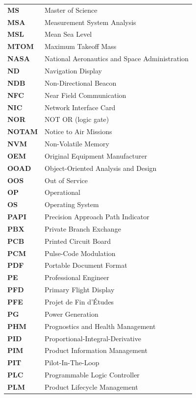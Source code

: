 \begin{longtable}{p{3cm}p{11cm}}
\textbf{MS} & Master of Science \\
\textbf{MSA} & Measurement System Analysis \\
\textbf{MSL} & Mean Sea Level \\
\textbf{MTOM} & Maximum Takeoff Mass \\
\textbf{NASA} & National Aeronautics and Space Administration \\
\textbf{ND} & Navigation Display \\
\textbf{NDB} & Non-Directional Beacon \\
\textbf{NFC} & Near Field Communication \\
\textbf{NIC} & Network Interface Card \\
\textbf{NOR} & NOT OR (logic gate) \\
\textbf{NOTAM} & Notice to Air Missions \\
\textbf{NVM} & Non-Volatile Memory \\
\textbf{OEM} & Original Equipment Manufacturer \\
\textbf{OOAD} & Object-Oriented Analysis and Design \\
\textbf{OOS} & Out of Service \\
\textbf{OP} & Operational \\
\textbf{OS} & Operating System \\
\textbf{PAPI} & Precision Approach Path Indicator \\
\textbf{PBX} & Private Branch Exchange \\
\textbf{PCB} & Printed Circuit Board \\
\textbf{PCM} & Pulse-Code Modulation \\
\textbf{PDF} & Portable Document Format \\
\textbf{PE} & Professional Engineer \\
\textbf{PFD} & Primary Flight Display \\
\textbf{PFE} & Projet de Fin d'Études \\
\textbf{PG} & Power Generation \\
\textbf{PHM} & Prognostics and Health Management \\
\textbf{PID} & Proportional-Integral-Derivative \\
\textbf{PIM} & Product Information Management \\
\textbf{PIT} & Pilot-In-The-Loop \\
\textbf{PLC} & Programmable Logic Controller \\
\textbf{PLM} & Product Lifecycle Management \\

\end{longtable}
